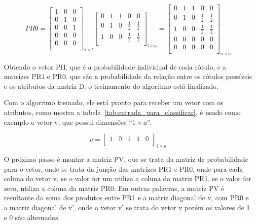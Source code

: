 $$PR0=\left[
\begin{array}{ccc}
1 & 0 & 0 \\
0 & 1 & 0 \\
0 & 0 & 1 \\
0 & 0 & 0 \\
0 & 0 & 0 \\
\end{array}
\right]_{a \times l}
\left[
\begin{array}{ccccc}
0 & 1 & 1 & 0 & 0 \\
0 & 1 & 0 & \frac{1}{2} & \frac{1}{2} \\
1 & 0 & 0 & \frac{1}{2} & \frac{1}{2} \\
\end{array}
\right]_{l \times a}
= \left[
\begin{array}{ccccc}
0 & 1 & 1 & 0 & 0 \\
0 & 1 & 0 & \frac{1}{2} & \frac{1}{2} \\
1 & 0 & 0 & \frac{1}{2} & \frac{1}{2} \\
0 & 0 & 0 & 0 & 0 \\
0 & 0 & 0 & 0 & 0 \\
\end{array}
\right]_{a \times a}$$

Obtendo o vetor PH, que é a probabilidade individual de cada rótulo, e a
matrizes PR1 e PR0, que são a probabilidade da relação entre os rótulos
possíveis e os atributos da matriz D, o treinamento do algoritmo está
finalizado.

Com o algoritmo treinado, ele está pronto para receber um vetor com
os atributos, como mostra a tabela~\ref{tab:entrada_para_classificar},
é usado como exemplo o vetor v, que possui dimensões ``${1 \times a}$''.

$$v=\left[
\begin{array}{ccccc}
1 & 0 & 1 & 1 & 0 \\
\end{array}
\right]_{1 \times a}$$

O próximo passo é montar a matriz PV, que se trata da matriz de
probabilidade para o vetor, onde se trata da junção das matrizes
PR1 e PR0, onde para cada coluna do vetor v, se o valor for um
utiliza a coluna da matriz PR1, se o valor for zero, utiliza a
coluna da matriz PR0. Em outras palavras, a matriz PV é resultante
da soma dos produtos entre PR1 e a matriz diagonal de v, com PR0
e a matriz diagonal de v', onde o vetor v' se trata do vetor v
porém os valores de 1 e 0 são alternados.

